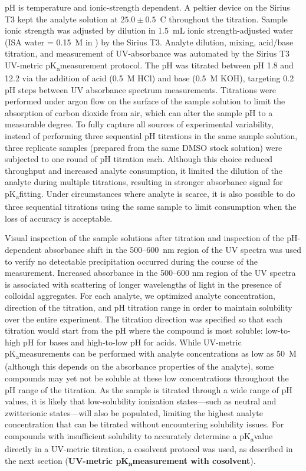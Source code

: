 \documentclass[9pt,lineno]{elife}
\newcommand{\pKa}{pK\textsubscript{a}}
\begin{document}
pH is temperature and ionic-strength dependent. 
A peltier device on the Sirius T3 kept the analyte solution at $25.0 \pm 0.5$~\textdegree C throughout the titration. 
Sample ionic strength was adjusted by dilution in 1.5~mL ionic strength-adjusted water (ISA water = 0.15~M  in ) by the Sirius T3.  
Analyte dilution, mixing, acid/base titration, and measurement of UV-absorbance was automated by the Sirius T3 UV-metric \pKa measurement protocol. 
The pH was titrated between pH 1.8 and 12.2 via the addition of acid (0.5~M HCl) and base (0.5~M KOH), targeting 0.2 pH steps between UV absorbance spectrum measurements. 
Titrations were performed under argon flow on the surface of the sample solution to limit the absorption of carbon dioxide from air, which can alter the sample pH to a measurable degree. 
To fully capture all sources of experimental variability, instead of performing three sequential pH titrations in the same sample solution, three replicate samples (prepared from the same DMSO stock solution) were subjected to one round of pH titration each. 
Although this choice reduced throughput and increased analyte consumption, it limited the dilution of the analyte during multiple titrations, resulting in stronger absorbance signal for \pKa fitting. Under circumstances where analyte is scarce, it is also possible to do three sequential titrations using the same sample to limit consumption when the loss of accuracy is acceptable. 

Visual inspection of the sample solutions after titration and inspection of the pH-dependent absorbance shift in the 500--600~nm region of the UV spectra was used to verify no detectable precipitation occurred during the course of the measurement. 
Increased absorbance in the 500--600 nm region of the UV spectra is associated with scattering of longer wavelengths of light in the presence of colloidal aggregates. 
For each analyte, we optimized analyte concentration, direction of the titration, and pH titration range in order to maintain solubility over the entire experiment. 
The titration direction was specified so that each titration would start from the pH where the compound is most soluble: low-to-high pH for bases and high-to-low pH for acids. 
While UV-metric \pKa measurements can be performed with analyte concentrations as low as 50~{\micro}M (although this depends on the absorbance properties of the analyte), some compounds may yet not be soluble at these low concentrations throughout the pH range of the titration. 
As the sample is titrated through a wide range of pH values, it is likely that low-solubility ionization states---such as neutral and zwitterionic states---will also be populated, limiting the highest analyte concentration that can be titrated without encountering solubility issues.  
For compounds with insufficient solubility to accurately determine a \pKa value directly in a UV-metric titration, a cosolvent protocol was used, as described in the next section ({\bf UV-metric \pKa measurement with cosolvent}). 
\end{document}
